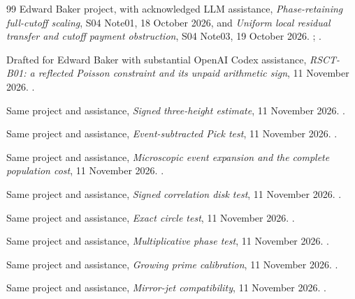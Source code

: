 \begin{thebibliography}{99}
Edward Baker project, with acknowledged LLM assistance,
\emph{Phase-retaining full-cutoff scaling}, S04 Note01,
18 October 2026, and \emph{Uniform local residual transfer and cutoff
payment obstruction}, S04 Note03, 19 October 2026.
;
.

Drafted for Edward Baker with substantial OpenAI Codex assistance,
\emph{RSCT-B01: a reflected Poisson constraint and its unpaid arithmetic sign},
11 November 2026.
.

Same project and assistance,
\emph{Signed three-height estimate}, 11 November 2026.
.

Same project and assistance,
\emph{Event-subtracted Pick test}, 11 November 2026.
.

Same project and assistance,
\emph{Microscopic event expansion and the complete population cost},
11 November 2026.
.

Same project and assistance,
\emph{Signed correlation disk test}, 11 November 2026.
.

Same project and assistance,
\emph{Exact circle test}, 11 November 2026.
.

Same project and assistance,
\emph{Multiplicative phase test}, 11 November 2026.
.

Same project and assistance,
\emph{Growing prime calibration}, 11 November 2026.
.

Same project and assistance,
\emph{Mirror-jet compatibility}, 11 November 2026.
.


\end{thebibliography}
